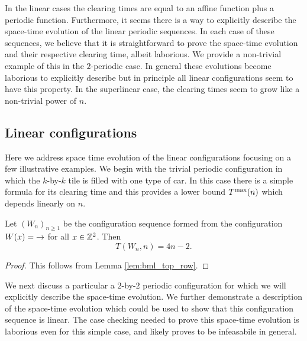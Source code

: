 \documentclass[reqno]{amsart}
\begin{document}
In the linear cases the clearing times are equal to an affine function plus a periodic function. Furthermore, it seems there is a way to explicitly describe the space-time evolution of the linear periodic sequences. In each case of these sequences, we believe that it is straightforward to prove the space-time evolution and their respective clearing time, albeit laborious. We provide a non-trivial example of this in the $2$-periodic case. In general these evolutions become laborious to explicitly describe but in principle all linear configurations seem to have this property. In the superlinear case, the clearing times seem to grow like a non-trivial power of $n$.

\subsection{Linear configurations} \label{sec:linearconfigs}
Here we address space time evolution of the linear configurations focusing on a few illustrative examples.
We begin with the trivial periodic configuration in which the $k $-by-$ k$ tile is filled with one type of car. In this case there is a simple formula for its clearing time and this provides a lower bound $T^{\text{\rm max}}(n)$ which depends linearly on $n$.

\begin{proposition} \label{prop:linear_filled}
    Let $(W_n)_{n \geq 1}$ be the configuration sequence formed from the configuration $W(x)=\mathord{\rightarrow}$ for all $x \in \mathbb{Z}^2$. Then $$T(W_n,n) = 4n-2.$$
\end{proposition}

\begin{proof}
    This follows from Lemma \ref{lem:bml_top_row}.
\end{proof}

We next discuss a particular a $2 $-by-$ 2$ periodic configuration for which we will explicitly describe the space-time evolution.  We further demonstrate a description of the space-time evolution which could be used to show that this configuration sequence is linear. The case checking needed to prove this space-time evolution is laborious even for this simple case, and likely proves to be infeasabile in general.
\end{document}
